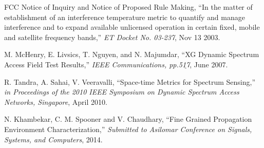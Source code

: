 \documentclass[12pt, draftclsnofoot, onecolumn]{IEEEtran}
\begin{document}
\begin{thebibliography}{10}
{FCC Notice of Inquiry and Notice of Proposed Rule Making}, ``{In the matter of
  establishment of an interference temperature metric to quantify and manage
  interference and to expand available unlicensed operation in certain fixed,
  mobile and satellite frequency bands},'' \emph{ET Docket No. 03-237}, Nov 13
  2003.

{M. McHenry, E. Livsics, T. Nguyen, and N. Majumdar}, ``{XG Dynamic Spectrum
  Access Field Test Results},'' \emph{IEEE Communications, pp.51ֵ7}, June
  2007.

{R. Tandra, A. Sahai, V. Veeravalli}, ``{Space-time Metrics for Spectrum
  Sensing},'' \emph{in Proceedings of the 2010 IEEE Symposium on Dynamic
  Spectrum Access Networks, Singapore}, April 2010.

{N. Khambekar, C. M. Spooner and V. Chaudhary}, ``{Fine Grained Propagation
  Environment Characterization},'' \emph{Submitted to Asilomar Conference on
  Signals, Systems, and Computers}, 2014.

\end{thebibliography}
\end{document}
